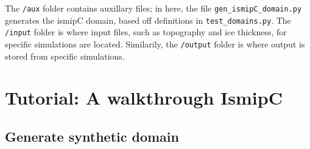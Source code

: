 \documentclass[11pt, reqno, nocenter]{article}
\begin{document}
The {\tt /aux} folder contains auxillary files; in here, the file {\tt gen\_ismipC\_domain.py} generates the ismipC domain,  based off definitions in {\tt test\_domains.py}. The {\tt /input} folder is where input files, such as topography and ice thickness, for specific simulations are located. Similarily, the {\tt /output} folder is where output is stored from specific simulations.

\section{Tutorial: A walkthrough IsmipC}

\subsection{Generate synthetic domain}
\end{document}
